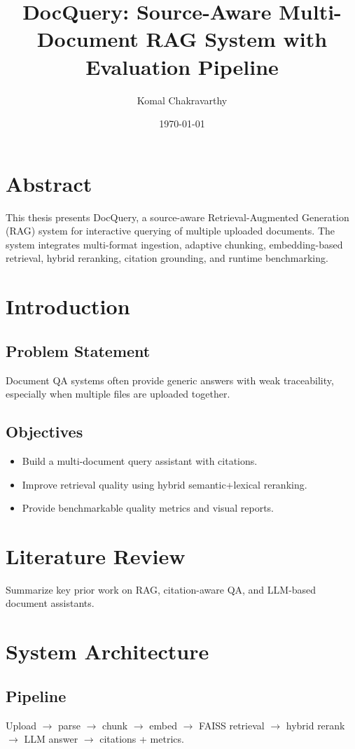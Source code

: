 \documentclass[12pt,a4paper]{report}
\title{DocQuery: Source-Aware Multi-Document RAG System with Evaluation Pipeline}
\author{Komal Chakravarthy}
\date{\today}
\begin{document}
\maketitle
\tableofcontents

\chapter*{Abstract}
This thesis presents DocQuery, a source-aware Retrieval-Augmented Generation (RAG) system for interactive querying of multiple uploaded documents. The system integrates multi-format ingestion, adaptive chunking, embedding-based retrieval, hybrid reranking, citation grounding, and runtime benchmarking.

\chapter{Introduction}
\section{Problem Statement}
Document QA systems often provide generic answers with weak traceability, especially when multiple files are uploaded together.

\section{Objectives}
\begin{itemize}
  \item Build a multi-document query assistant with citations.
  \item Improve retrieval quality using hybrid semantic+lexical reranking.
  \item Provide benchmarkable quality metrics and visual reports.
\end{itemize}

\chapter{Literature Review}
Summarize key prior work on RAG, citation-aware QA, and LLM-based document assistants.

\chapter{System Architecture}
\section{Pipeline}
Upload $\rightarrow$ parse $\rightarrow$ chunk $\rightarrow$ embed $\rightarrow$ FAISS retrieval $\rightarrow$ hybrid rerank $\rightarrow$ LLM answer $\rightarrow$ citations + metrics.
\end{document}
